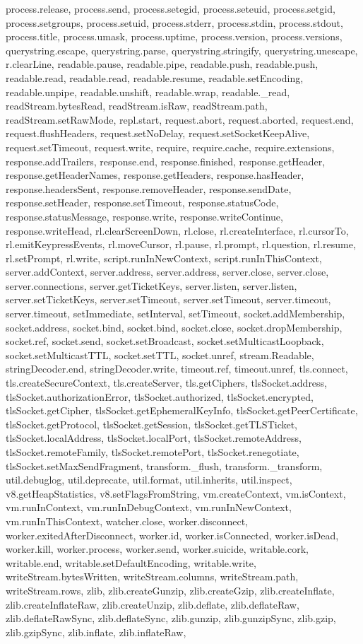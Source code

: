 {process.release, process.send, process.setegid, process.seteuid, process.setgid, process.setgroups, process.setuid, process.stderr, process.stdin, process.stdout, process.title, process.umask, process.uptime, process.version, process.versions, querystring.escape, querystring.parse, querystring.stringify, querystring.unescape, r.clearLine, readable.pause, readable.pipe, readable.push, readable.push, readable.read, readable.read, readable.resume, readable.setEncoding, readable.unpipe, readable.unshift, readable.wrap, readable._read, readStream.bytesRead, readStream.isRaw, readStream.path, readStream.setRawMode, repl.start, request.abort, request.aborted, request.end, request.flushHeaders, request.setNoDelay, request.setSocketKeepAlive, request.setTimeout, request.write, require, require.cache, require.extensions, response.addTrailers, response.end, response.finished, response.getHeader, response.getHeaderNames, response.getHeaders, response.hasHeader, response.headersSent, response.removeHeader, response.sendDate, response.setHeader, response.setTimeout, response.statusCode, response.statusMessage, response.write, response.writeContinue, response.writeHead, rl.clearScreenDown, rl.close, rl.createInterface, rl.cursorTo, rl.emitKeypressEvents, rl.moveCursor, rl.pause, rl.prompt, rl.question, rl.resume, rl.setPrompt, rl.write, script.runInNewContext, script.runInThisContext, server.addContext, server.address, server.address, server.close, server.close, server.connections, server.getTicketKeys, server.listen, server.listen, server.setTicketKeys, server.setTimeout, server.setTimeout, server.timeout, server.timeout, setImmediate, setInterval, setTimeout, socket.addMembership, socket.address, socket.bind, socket.bind, socket.close, socket.dropMembership, socket.ref, socket.send, socket.setBroadcast, socket.setMulticastLoopback, socket.setMulticastTTL, socket.setTTL, socket.unref, stream.Readable, stringDecoder.end, stringDecoder.write, timeout.ref, timeout.unref, tls.connect, tls.createSecureContext, tls.createServer, tls.getCiphers, tlsSocket.address, tlsSocket.authorizationError, tlsSocket.authorized, tlsSocket.encrypted, tlsSocket.getCipher, tlsSocket.getEphemeralKeyInfo, tlsSocket.getPeerCertificate, tlsSocket.getProtocol, tlsSocket.getSession, tlsSocket.getTLSTicket, tlsSocket.localAddress, tlsSocket.localPort, tlsSocket.remoteAddress, tlsSocket.remoteFamily, tlsSocket.remotePort, tlsSocket.renegotiate, tlsSocket.setMaxSendFragment, transform._flush, transform._transform, util.debuglog, util.deprecate, util.format, util.inherits, util.inspect, v8.getHeapStatistics, v8.setFlagsFromString, vm.createContext, vm.isContext, vm.runInContext, vm.runInDebugContext, vm.runInNewContext, vm.runInThisContext, watcher.close, worker.disconnect, worker.exitedAfterDisconnect, worker.id, worker.isConnected, worker.isDead, worker.kill, worker.process, worker.send, worker.suicide, writable.cork, writable.end, writable.setDefaultEncoding, writable.write, writeStream.bytesWritten, writeStream.columns, writeStream.path, writeStream.rows, zlib, zlib.createGunzip, zlib.createGzip, zlib.createInflate, zlib.createInflateRaw, zlib.createUnzip, zlib.deflate, zlib.deflateRaw, zlib.deflateRawSync, zlib.deflateSync, zlib.gunzip, zlib.gunzipSync, zlib.gzip, zlib.gzipSync, zlib.inflate, zlib.inflateRaw, }
